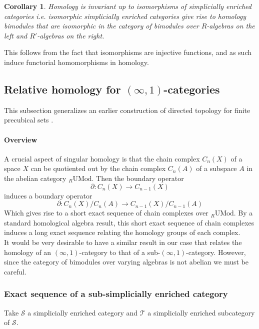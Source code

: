\documentclass[a4paper,fleqn]{cas-sc}
\newtheorem{cor}[thm]{Corollary}
\newcommand{\md}{\mathrm{UMod}}
\newcommand{\cS}{{\mathcal{S}}}
\newcommand{\cT}{{\mathcal{T}}}
\begin{document}
\begin{cor}
\label{cor:18}
Homology is invariant up to isomorphisms of simplicially enriched categories i.e. isomorphic simplicially enriched categories give rise to homology bimodules that are isomorphic in the category of bimodules over $R$-algebras on the left and $R'$-algebras on the right.
\end{cor}

This follows from the fact that isomorphisms are injective functions, and as such induce functorial homomorphisms in homology. 

\subsection{Relative homology for $(\infty,1)$-categories}

This subsection generalizes an earlier construction of directed topology for finite precubical sets \cite{eric}.

\paragraph{Overview } A crucial aspect of singular homology is that the chain complex $C_n(X)$ of a space $X$ can be quotiented out by the chain complex $C_n(A)$ of a subspace $A$ in the abelian category  $_R \md$. Then the boundary operator 
\[\partial : C_n(X) \to C_{n-1}(X)\]
induces a boundary operator
\[ \partial : C_n(X){/ C_n(A)} \to C_{n-1}(X){/ C_{n-1}(A)}\]
Which gives rise to a short exact sequence of chain complexes over $_R \md$. By a standard homological algebra result, this short exact sequence of chain complexes induces a long exact sequence relating the homology groups of each complex.\\

It would be very desirable to have a similar result in our case that relates the homology of an $(\infty,1)$-category to that of a sub-$(\infty,1)$-category. However, since the category of bimodules over varying algebras is not abelian we must be careful. 



\subsubsection{Exact sequence of a sub-simplicially enriched category}
\label{sec:exact}

Take $\cS$ a simplicially enriched category and $\cT$ a simplicially enriched subcategory of $\cS$. \\
\end{document}
